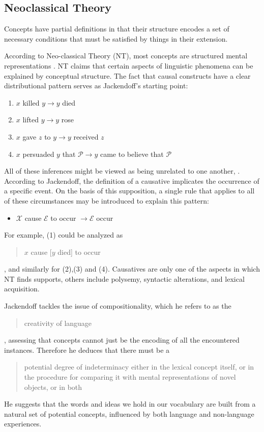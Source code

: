 \subsection{Neoclassical Theory}
\begin{mycolorbox}
	Concepts have partial definitions in that their structure encodes a set of necessary conditions that must be satisfied by things in their extension.
\end{mycolorbox}

According to Neo-classical Theory (NT), most concepts are structured mental representations . NT claims that certain aspects of linguistic phenomena can be explained by conceptual structure. The fact that causal constructs have a clear distributional pattern serves as Jackendoff's starting point:
\begin{enumerate}
	\singlespacing
	\item \(x\) killed \(y \rightarrow y\) died
	\item \(x\) lifted \(y \rightarrow y\) rose
	\item \(x\) gave \(z\) to \(y \rightarrow y\) received \(z\)
	\item \(x\) persuaded \(y\) that \(\mathcal{P} \rightarrow y\) came to believe that $\mathcal{P}$
\end{enumerate}
All of these inferences might be viewed as being unrelated to one another, . According to Jackendoff, the definition of a causative implicates the occurrence of a specific event. On the basis of this supposition, a single rule that applies to all of these circumstances may be introduced to explain this pattern:
\begin{itemize}
	\item \(\mathcal{X}\) cause
	 \(\mathcal{E}\) to occur
	  $\rightarrow \mathcal{E}$ occur
\end{itemize}
For example, (1) could be analyzed as \blockquote{\(x\) cause [\(y\) died] to occur}, and similarly for (2),(3) and (4). Causatives are only one of the aspects in which NT finds supports, others include polysemy, syntactic alterations, and lexical acquisition.

 Jackendoff tackles the issue of compositionality, which he refers to as the \blockquote{creativity of language}, assessing that concepts cannot just be the encoding of all the encountered instances. Therefore he deduces that there must be a \blockcquote{Jackendoff1989}{potential degree of indeterminacy either in the lexical concept itself, or in the procedure for comparing it with mental representations of novel objects, or in both}. He suggests that the words and ideas we hold in our vocabulary are built from a natural set of potential concepts, influenced by both language and non-language experiences.
 

